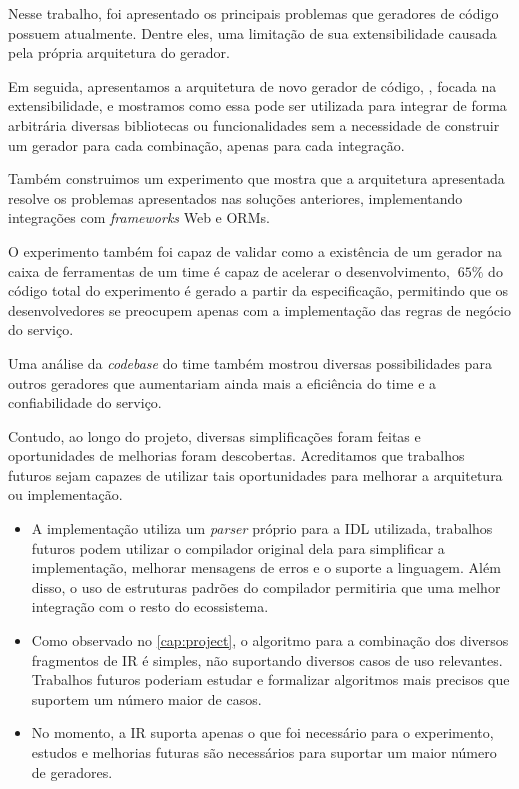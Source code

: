 Nesse trabalho, foi apresentado os principais problemas que geradores de código
possuem atualmente. Dentre eles, uma limitação de sua extensibilidade causada
pela própria arquitetura do gerador.

Em seguida, apresentamos a arquitetura de novo gerador de código, \Baker{}, focada
na extensibilidade, e mostramos como essa pode ser utilizada para integrar de forma
arbitrária diversas bibliotecas ou funcionalidades sem a necessidade de construir um
gerador para cada combinação, apenas para cada integração.

Também construimos um experimento que mostra que a arquitetura apresentada
resolve os problemas apresentados nas soluções anteriores, implementando
integrações com \textit{frameworks} Web e ORMs.

O experimento também foi capaz de validar como a existência de um gerador na
caixa de ferramentas de um time é capaz de acelerar o desenvolvimento, $~65\%$
do código total do experimento é gerado a partir da especificação, permitindo
que os desenvolvedores se preocupem apenas com a implementação das regras de
negócio do serviço.

Uma análise da \textit{codebase} do time também mostrou diversas possibilidades
para outros geradores que aumentariam ainda mais a eficiência do time e a
confiabilidade do serviço.

Contudo, ao longo do projeto, diversas simplificações foram feitas e oportunidades
de melhorias foram descobertas. Acreditamos que trabalhos futuros sejam capazes
de utilizar tais oportunidades para melhorar a arquitetura ou implementação.

\begin{itemize}
\item A implementação utiliza um \textit{parser} próprio para a IDL utilizada,
  trabalhos futuros podem utilizar o compilador original dela para simplificar a
  implementação, melhorar mensagens de erros e o suporte a linguagem. Além disso,
  o uso de estruturas padrões do compilador permitiria que uma melhor integração
  com o resto do ecossistema.
\item Como observado no \cref{cap:project}, o algoritmo para a combinação dos
  diversos fragmentos de IR é simples, não suportando diversos casos de uso
  relevantes. Trabalhos futuros poderiam estudar e formalizar algoritmos mais precisos
  que suportem um número maior de casos.
\item No momento, a IR suporta apenas o que foi necessário para o experimento,
  estudos e melhorias futuras são necessários para suportar um maior número de
  geradores.
\end{itemize}
